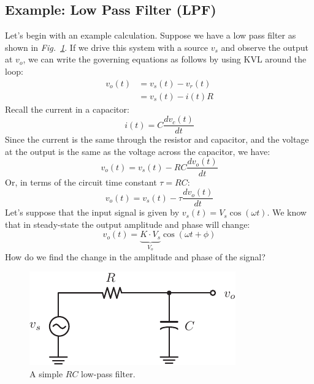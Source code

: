 \subsection{Example:  Low Pass Filter (LPF)}
Let's begin with an example calculation.  Suppose we have a low pass filter as shown in \emph{Fig.~\ref{fig:lpf}}.  If we drive this system with a source $v_s$ and observe the output at $v_o$, we can write the governing equations as follows by using KVL around the loop:
    \begin{align*}
        v_o(t) &= v_s(t) - v_r(t)\\
        &= v_s(t) - i(t) R
    \end{align*}
Recall the current in a capacitor:
    \begin{equation}
        i(t) = C \frac{dv_c(t)}{dt} \label{eq:cap_curr}
    \end{equation}
Since the current is the same through the resistor and capacitor, and the voltage at the output is the same as the voltage across the capacitor, we have:
    \begin{equation*}
        v_o(t) = v_s(t) - RC \frac{dv_o(t)}{dt}
    \end{equation*}
Or, in terms of the circuit time constant $\tau = RC$:
    \begin{equation}
        v_o(t) = v_s(t) - \tau \frac{dv_o(t)}{dt} \label{eq:lpf_diff}
    \end{equation}
Let's suppose that the input signal is given by $v_s(t) = V_s \cos(\omega t)$.  We know that in steady-state  the output amplitude and phase will change: 
    \begin{equation}
        v_o(t) = \underbrace{K \cdot V_s}_{V_o} \cos(\omega t + \phi) \label{eq:kvl1}
    \end{equation}  
How do we find the change in the amplitude and phase of the signal?
\begin{figure}[tb]
\centering
\includegraphics[scale=1]{lpf}
\caption{A simple $RC$ low-pass filter.}
\label{fig:lpf}
\end{figure}
